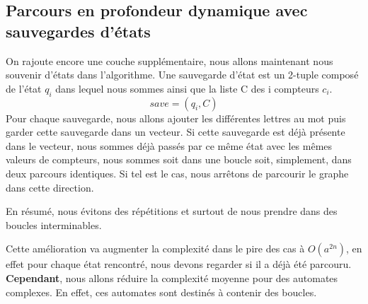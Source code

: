 \subsection{Parcours en profondeur dynamique avec sauvegardes d'états}
On rajoute encore une couche supplémentaire, nous allons maintenant nous souvenir d'états dans l'algorithme. Une sauvegarde d'état est un 2-tuple composé de l'état $q_{i}$ dans lequel nous sommes ainsi que la liste C des i compteurs  $c_{i}$.
\[ save = (q_{i}, C) \]
Pour chaque sauvegarde, nous allons ajouter les différentes lettres au mot puis garder cette sauvegarde dans un vecteur. Si cette sauvegarde est déjà présente dans le vecteur, nous sommes déjà passés par ce même état avec les mêmes valeurs de compteurs, nous sommes soit dans une boucle soit, simplement, dans deux parcours identiques. Si tel est le cas, nous arrêtons de parcourir le graphe dans cette direction.\par
En résumé, nous évitons des répétitions et surtout de nous prendre dans des boucles interminables.\par
Cette amélioration va augmenter la complexité dans le pire des cas à  $O(a^{2n})$, en effet pour chaque état rencontré, nous devons regarder si il a déjà été parcouru. \textbf{Cependant}, nous allons réduire la complexité moyenne pour des automates complexes. En effet, ces automates sont destinés à contenir des boucles.\par

